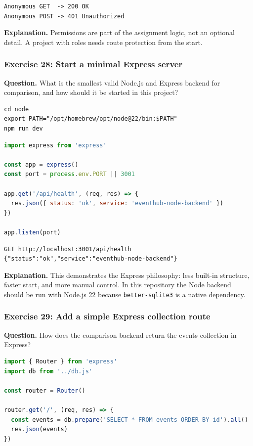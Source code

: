 \documentclass[11pt,a4paper]{article}
\begin{document}
\begin{lstlisting}[style=terminal]
Anonymous GET  -> 200 OK
Anonymous POST -> 401 Unauthorized
\end{lstlisting}

\textbf{Explanation.} Permissions are part of the assignment logic, not an optional detail. A project with roles needs route protection from the start.

\subsubsection*{Exercise 28: Start a minimal Express server}
\textbf{Question.} What is the smallest valid Node.js and Express backend for comparison, and how should it be started in this project?

\begin{lstlisting}[style=terminal]
cd node
export PATH="/opt/homebrew/opt/node@22/bin:$PATH"
npm run dev
\end{lstlisting}

\begin{lstlisting}[style=code, language=JavaScript]
import express from 'express'

const app = express()
const port = process.env.PORT || 3001

app.get('/api/health', (req, res) => {
  res.json({ status: 'ok', service: 'eventhub-node-backend' })
})

app.listen(port)
\end{lstlisting}

\begin{lstlisting}[style=terminal]
GET http://localhost:3001/api/health
{"status":"ok","service":"eventhub-node-backend"}
\end{lstlisting}

\textbf{Explanation.} This demonstrates the Express philosophy: less built-in structure, faster start, and more manual control. In this repository the Node backend should be run with Node.js 22 because \texttt{better-sqlite3} is a native dependency.

\subsubsection*{Exercise 29: Add a simple Express collection route}
\textbf{Question.} How does the comparison backend return the events collection in Express?

\begin{lstlisting}[style=code, language=JavaScript]
import { Router } from 'express'
import db from '../db.js'

const router = Router()

router.get('/', (req, res) => {
  const events = db.prepare('SELECT * FROM events ORDER BY id').all()
  res.json(events)
})
\end{lstlisting}
\end{document}
